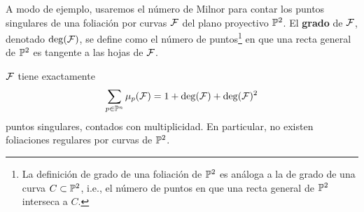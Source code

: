 A modo de ejemplo, usaremos el número de Milnor para contar los puntos singulares de una foliación por curvas $\F$ del plano proyectivo $\P^2$. El \textbf{grado} de $\F$, denotado $\deg(\F)$, se define como el número de puntos\footnote{La definición de grado de una foliación de $\P^2$ es análoga a la de grado de una curva $C \subset \P^2$, i.e., el número de puntos en que una recta general de $\P^2$ interseca a $C$.} en que una recta general de $\P^2$ es tangente a las hojas de $\F$.

\begin{theorem}
$\F$ tiene exactamente
$$\sum_{p \in \P^n} \mu_p(\F) = 1 + \deg(\F) + \deg(\F)^2$$
puntos singulares, contados con multiplicidad. En particular, no existen foliaciones regulares por curvas de $\P^2$.
\end{theorem}

